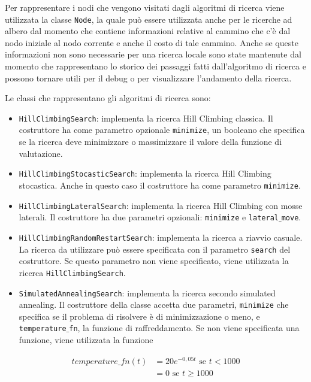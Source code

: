 Per rappresentare i nodi che vengono visitati dagli algoritmi di ricerca viene utilizzata la classe \texttt{Node}, la quale può essere utilizzata anche per le ricerche ad albero dal momento che contiene informazioni relative al cammino che c'è dal nodo iniziale al nodo corrente e anche il costo di tale cammino.
Anche se queste informazioni non sono necessarie per una ricerca locale sono state mantenute dal momento che rappresentano lo storico dei passaggi fatti dall'algoritmo di ricerca e possono tornare utili per il debug o per visualizzare l'andamento della ricerca.

Le classi che rappresentano gli algoritmi di ricerca sono:
\begin{itemize}
\item \texttt{HillClimbingSearch}: implementa la ricerca Hill Climbing classica. Il costruttore ha come parametro opzionale \texttt{minimize}, un booleano che specifica se la ricerca deve minimizzare o massimizzare il valore della funzione di valutazione.
\item \texttt{HillClimbingStocasticSearch}: implementa la ricerca Hill Climbing stocastica. Anche in questo caso il costruttore ha come parametro \texttt{minimize}.
\item \texttt{HillClimbingLateralSearch}: implementa la ricerca Hill Climbing con mosse laterali. Il costruttore ha due parametri opzionali: \texttt{minimize} e \texttt{lateral$\_$move}.
\item \texttt{HillClimbingRandomRestartSearch}: implementa la ricerca a riavvio casuale. La ricerca da utilizzare può essere specificata con il parametro \texttt{search} del costruttore. Se questo parametro non viene specificato, viene utilizzata la ricerca \texttt{HillClimbingSearch}.
\item \texttt{SimulatedAnnealingSearch}: implementa la ricerca secondo simulated annealing. Il costruttore della classe accetta due parametri, \texttt{minimize} che specifica se il problema di risolvere è di minimizzazione o meno, e \texttt{temperature$\_$fn}, la funzione di raffreddamento. Se non viene specificata una funzione, viene utilizzata la funzione 
\end{itemize}

\begin{align*}
temperature\_fn(t) &= 20 e^{-0,05t} \text{ se }  t < 1000 \\
&= 0  \text{ se }  t \geq 1000
\end{align*}









